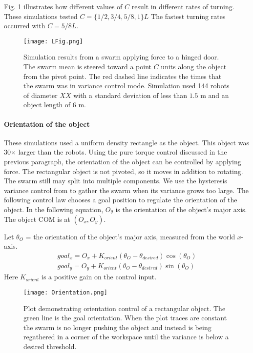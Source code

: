  Fig. \ref{fig:LFig} illustrates how different values of $C$ result in different rates of turning. These simulations tested $C = \{1/2, 3/4, 5/8, 1\}L$  The fastest turning rates occurred with  $C =  5/8L$. 



\begin{figure}
\begin{center}
	\texttt{[image: LFig.png]}
\end{center}
\vspace{-1em}
\caption{\label{fig:LFig}
Simulation results from a swarm applying force to a hinged door. 
The swarm mean is steered toward a point $C$ units along the object from the pivot point. The red dashed line indicates the times that the swarm was in variance control mode.
 Simulation used 144 robots of diameter $XX$ with a standard deviation of less than $1.5$ m and an object length of $6$ m.
}
\vspace{-1em}
\end{figure}


\paragraph{Orientation of the object}
These simulations used a uniform density rectangle as the object. This object was 30$\times$ larger than the robots.
Using the pure torque control discussed in the previous paragraph, the orientation of the object can be controlled by applying force. 
The rectangular object is not pivoted, so it moves in addition to rotating. 
 The swarm still may split into multiple components.
  We use the hysteresis variance control from \cite{ShahrokhiIROS2015}  to gather the swarm when its variance grows too large. 
  The following control law chooses a goal position to regulate the orientation of the object.  In the following equation, $O_{\theta}$ is the orientation of the object's major axis. The object COM is at $(O_x,O_y)$.

Let $\theta_O$ = the orientation of the object's major axis, measured from the world $x$-axis.
\begin{align}\nonumber
goal_x = O_x +  K_{orient}  ( \theta_O - \theta_{desired} ) \cos(\theta_O) \\
goal_y = O_y +  K_{orient}  ( \theta_O - \theta_{desired} ) \sin(\theta_O)
\end{align}
Here $K_{orient}$ is a positive gain on the control input.  


\begin{figure}
\begin{center}
	\texttt{[image: Orientation.png]}
\end{center}
\vspace{-1em}
\caption{\label{fig:OrientCont}
Plot demonstrating  orientation control of a rectangular object. The green line is the goal orientation.   When the plot traces are constant the swarm is no longer pushing the object and instead is being regathered in a corner of the workspace until the variance is below a desired threshold. 
}
\vspace{-1em}
\end{figure}

